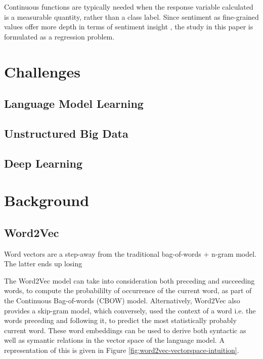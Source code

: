 \documentclass[conference]{IEEEtran}
\begin{document}
Continuous functions are typically needed when the response variable calculated is a measurable quantity, rather than a class label. Since sentiment as fine-grained values offer more depth in terms of sentiment insight \cite{drake2008sentiment}, the study in this paper is formulated as a regression problem.

\vspace{5mm}

\section{Challenges}

\subsection{Language Model Learning}

\subsection{Unstructured Big Data}

\subsection{Deep Learning}


\vspace{5mm}

\section{Background}

\subsection{Word2Vec} \label{Word2Vec}
Word vectors are a step-away from the traditional bag-of-words + n-gram model. The latter ends up losing

The Word2Vec model\cite{mikolov2013efficient} can take into consideration both preceding and succeeding words, to compute the probabililty of occurrence of the current word, as part of the Continuous Bag-of-words (CBOW) model. Alternatively, Word2Vec also provides a skip-gram model\cite{mikolov2013distributed}, which conversely, used the context of a word i.e. the words preceding and following it, to predict the most statistically probably current word. These word embeddings can be used to derive both syntactic as well as symantic relations in the vector space of the language model. A representation of this is given in Figure \ref{fig:word2vec-vectorspace-intuition}.
\end{document}
